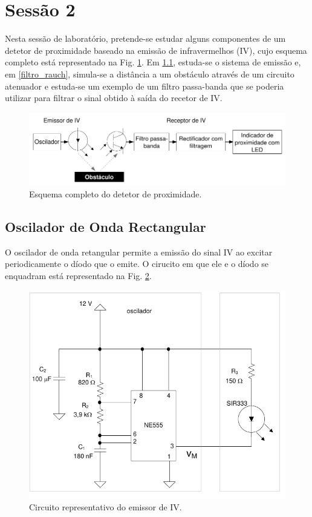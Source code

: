 \section{Sessão 2}

Nesta sessão de laboratório, pretende-se estudar alguns componentes de um detetor de proximidade baseado na emissão de infravermelhos (IV), cujo esquema completo está representado na Fig. \ref{fig:park_aid_scheme}. Em \ref{oscilador}, estuda-se o sistema de emissão e, em \ref{filtro_rauch}, simula-se a distância a um obstáculo através de um circuito atenuador e estuda-se um exemplo de um filtro passa-banda que se poderia utilizar para filtrar o sinal obtido à saída do recetor de IV.

\begin{figure}[ht]
    \centering
    \includegraphics{Imagens/park_aid_scheme.pdf}
    \caption{Esquema completo do detetor de proximidade.}
    \label{fig:park_aid_scheme}
\end{figure}

\subsection{Oscilador de Onda Rectangular} \label{oscilador}

O oscilador de onda retangular permite a emissão do sinal IV ao excitar periodicamente o díodo que o emite. O cirucito em que ele e o díodo se enquadram está representado na Fig.  \ref{fig:emissor}.

\begin{figure}[ht]
    \centering
    \includegraphics{Imagens/emissor.pdf}
    \caption{Circuito representativo do emissor de IV.}
    \label{fig:emissor}
\end{figure}


